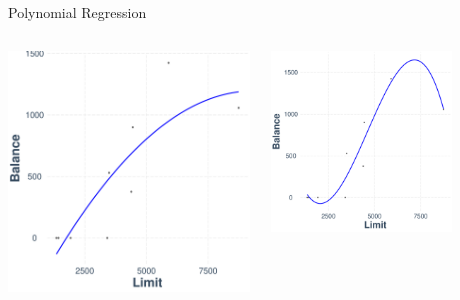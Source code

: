 \documentclass[11pt,compress,t,notes=noshow, xcolor=table]{beamer}
\begin{document}
\begin{vbframe}{Polynomial Regression}
\begin{columns}
\begin{column}{0.3\textwidth}
  \includegraphics[width = \textwidth]{figure/nutshell-regression-poly-plot-2.pdf}
\end{column}
\begin{column}{0.4\textwidth} 
\tiny {}
   \includegraphics[width = 0.75\textwidth]{figure/nutshell-regression-poly-plot-3.pdf}
\end{column}
\end{columns}


\end{vbframe}

\endlecture
\end{document}
